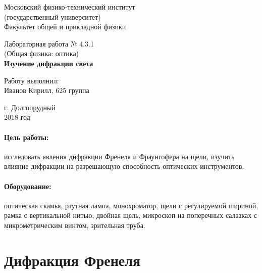 \documentclass[12pt]{kiarticle}
\begin{document}
	
	\begin{titlepage}
	\begin{center}
		\large 	Московский физико-технический институт \\
		(государственный университет) \\
		Факультет общей и прикладной физики \\
		\vspace{0.2cm}
		
		\vspace{4.5cm}
		Лабораторная работа № 4.3.1 \\ \vspace{0.2cm}
		\large (Общая физика: оптика) \\ \vspace{0.2cm}
		\LARGE \textbf{Изучение дифракции света}
	\end{center}
	\vspace{2.3cm} \large
	
	\begin{center}
		Работу выполнил: \\
		Иванов Кирилл,
		625 группа
		\vspace{10mm}		
		
	\end{center}
	
	\begin{center} \vspace{60mm}
		г. Долгопрудный \\
		2018 год
	\end{center}
\end{titlepage}
	
	\paragraph*{Цель работы:} исследовать явления дифракции Френеля и Фраунгофера на щели, изучить влияние дифракции на разрешающую способность оптических инструментов.
	
	\paragraph*{Оборудование:} оптическая скамья, ртутная лампа, монохроматор, щели с регулируемой шириной, рамка с вертикальной
нитью, двойная щель, микроскоп на поперечных салазках с микрометрическим винтом, зрительная труба.

	\section{Дифракция Френеля}
	
\end{document}
